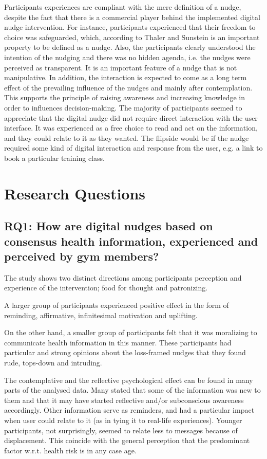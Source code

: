 Participants experiences are compliant with the mere definition of a nudge, despite the fact that there is a commercial player behind the implemented digital nudge intervention. For instance, participants experienced that their freedom to choice was safeguarded, which, according to Thaler and Sunstein \cite{thaler_nudge-_2009} is an important property to be defined as a nudge. Also, the participants clearly understood the intention of the nudging and there was no hidden agenda, i.e. the nudges were perceived as transparent. It is an important feature of a nudge that is not manipulative\cite{karlsen_recommendations_2019}. In addition, the interaction is expected to come as a long term effect of the prevailing influence of the nudges and mainly after contemplation. This supports the principle of raising awareness and increasing knowledge in order to influences decision-making. The majority of participants seemed to appreciate that the digital nudge did not require direct interaction with the user interface. It was experienced as a free choice to read and act on the information, and they could relate to it as they wanted. The flipside would be if the nudge required some kind of digital interaction and response from the user, e.g. a link to book a particular training class.

\section{Research Questions}
\subsection{RQ1: How are digital nudges based on consensus health information, experienced and perceived by gym members?}

The study shows two distinct directions among participants perception and experience of the intervention; food for thought and patronizing. 

A larger group of participants experienced positive effect in the form of reminding, affirmative, infinitesimal motivation and uplifting. 

On the other hand, a smaller group of participants felt that it was moralizing to communicate health information in this manner. These participants had particular and strong opinions about the loss-framed nudges that they found rude, tops-down and intruding.  

The contemplative and the reflective psychological effect can be found in many parts of the analysed data. Many stated that some of the information was new to them and that it may have started reflective and/or subconscious awareness accordingly. Other information serve as reminders, and had a particular impact when user could relate to it (as in tying it to real-life experiences). Younger participants, not surprisingly, seemed to relate less to messages because of displacement. This coincide with the general perception that the predominant factor w.r.t. health risk is in any case age.

